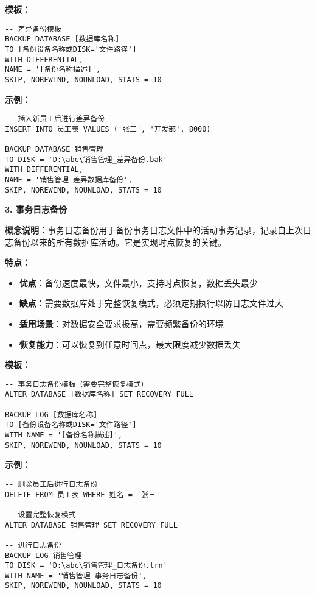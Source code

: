 \qquad \textbf{模板：}
\begin{mdframed}[backgroundcolor=gray!10]
\begin{verbatim}
-- 差异备份模板
BACKUP DATABASE [数据库名称]
TO [备份设备名称或DISK='文件路径']
WITH DIFFERENTIAL,
NAME = '[备份名称描述]',
SKIP, NOREWIND, NOUNLOAD, STATS = 10
\end{verbatim}
\end{mdframed}

\qquad \textbf{示例：}
\begin{mdframed}[backgroundcolor=blue!5]
\begin{verbatim}
-- 插入新员工后进行差异备份
INSERT INTO 员工表 VALUES ('张三', '开发部', 8000)

BACKUP DATABASE 销售管理
TO DISK = 'D:\abc\销售管理_差异备份.bak'
WITH DIFFERENTIAL,
NAME = '销售管理-差异数据库备份',
SKIP, NOREWIND, NOUNLOAD, STATS = 10
\end{verbatim}
\end{mdframed}

\textbf{3. 事务日志备份}

\qquad \textbf{概念说明：}事务日志备份用于备份事务日志文件中的活动事务记录，记录自上次日志备份以来的所有数据库活动。它是实现时点恢复的关键。

\qquad \textbf{特点：}
\begin{itemize}
  \item \textbf{优点}：备份速度最快，文件最小，支持时点恢复，数据丢失最少
  \item \textbf{缺点}：需要数据库处于完整恢复模式，必须定期执行以防日志文件过大
  \item \textbf{适用场景}：对数据安全要求极高，需要频繁备份的环境
  \item \textbf{恢复能力}：可以恢复到任意时间点，最大限度减少数据丢失
\end{itemize}

\qquad \textbf{模板：}
\begin{mdframed}[backgroundcolor=gray!10]
\begin{verbatim}
-- 事务日志备份模板（需要完整恢复模式）
ALTER DATABASE [数据库名称] SET RECOVERY FULL

BACKUP LOG [数据库名称]
TO [备份设备名称或DISK='文件路径']
WITH NAME = '[备份名称描述]',
SKIP, NOREWIND, NOUNLOAD, STATS = 10
\end{verbatim}
\end{mdframed}

\qquad \textbf{示例：}
\begin{mdframed}[backgroundcolor=blue!5]
\begin{verbatim}
-- 删除员工后进行日志备份
DELETE FROM 员工表 WHERE 姓名 = '张三'

-- 设置完整恢复模式
ALTER DATABASE 销售管理 SET RECOVERY FULL

-- 进行日志备份
BACKUP LOG 销售管理
TO DISK = 'D:\abc\销售管理_日志备份.trn'
WITH NAME = '销售管理-事务日志备份',
SKIP, NOREWIND, NOUNLOAD, STATS = 10
\end{verbatim}
\end{mdframed}


